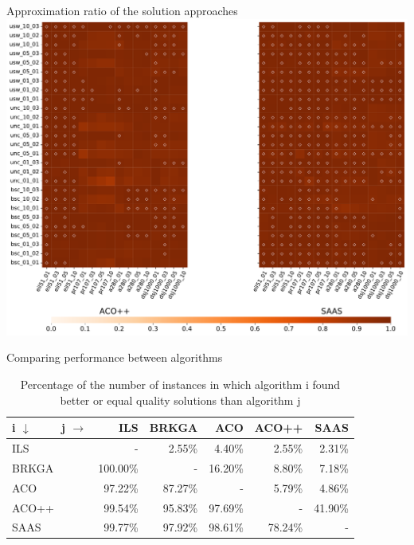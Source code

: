 \documentclass[aspectratio=169]{beamer}
\begin{document}
\begin{frame}{Approximation ratio of the solution approaches}
    \centering
    \includegraphics[width=0.6\linewidth]{img/profit_ratio_horizontal_2.pdf}
\end{frame}
\begin{frame}{Comparing performance between algorithms}
    \centering
    \begin{table}
        \small
        \caption{Percentage of the number of instances in which algorithm i found better or equal quality solutions than algorithm j}
        \label{tab:winpercent}
        \begin{tabular}{l|rrrrr}
            \hline
            i $\downarrow$ \ \ \ \ j $\rightarrow$ & ILS      & BRKGA   & ACO     & ACO++   & SAAS    \\
            \hline
            ILS                                    & -        & 2.55\%  & 4.40\%  & 2.55\%  & 2.31\%  \\
            BRKGA                                  & 100.00\% & -       & 16.20\% & 8.80\%  & 7.18\%  \\
            ACO                                    & 97.22\%  & 87.27\% & -       & 5.79\%  & 4.86\%  \\
            ACO++                                  & 99.54\%  & 95.83\% & 97.69\% & -       & 41.90\% \\
            SAAS                                   & 99.77\%  & 97.92\% & 98.61\% & 78.24\% & -       \\
            \hline
        \end{tabular}
    \end{table}
\end{frame}
\end{document}
